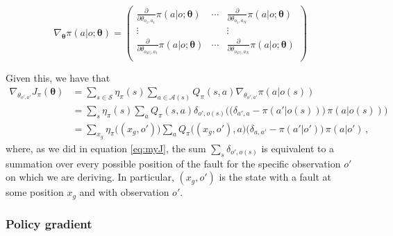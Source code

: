 \begin{equation}
    \nabla_{\boldsymbol \theta} \pi(a|o; \boldsymbol \theta) = \begin{pmatrix}
        \frac{\partial}{\partial \theta_{o_1,a_1}} \pi ( a | o; \boldsymbol \theta )
            & \cdots & \frac{\partial}{\partial \theta_{o_1,a_N}} \pi ( a | o; \boldsymbol \theta ) \\
        \vdots & &
        \vdots \\
        \frac{\partial}{\partial \theta_{o_{|\mathcal O|},a_1}} \pi ( a | o; \boldsymbol \theta ) 
            & \cdots & \frac{\partial}{\partial \theta_{o_{|\mathcal O|},a_N}} \pi ( a | o; \boldsymbol \theta ) \\
    \end{pmatrix}
\end{equation}

Given this, we have that
\begin{equation}
    \begin{aligned}
        \nabla_{\theta_{o',a'}} J_\pi (\boldsymbol \theta)
        &= \sum_{s \in \mathcal S} \eta_\pi(s) \sum_{a \in \mathcal A(s)} Q_\pi(s,a) \nabla_{\theta_{o',a'}} \pi(a|o(s)) \\
        &= \sum_s \eta_\pi(s) \sum_a Q_\pi(s,a) \delta_{o',o(s)} \Big( \big( \delta_{a',a} - \pi(a'|o(s)) \big) \, \pi(a|o(s)) \Big) \\
        &= \sum_{x_g} \eta_\pi \big((x_g, o') \big) \sum_a Q_\pi \big((x_g, o'),a \big) \big( \delta_{a,a'} - \pi(a'|o') \big) \, \pi(a|o') \, ,
    \end{aligned}
    \label{eq:mygradJ}
\end{equation}
where, as we did in equation \eqref{eq:myJ}, the sum $\sum_s \delta_{o', o(s)}$ is equivalent to a summation over every possible position of the fault for the specific observation $o'$ on which we are deriving. In particular, $(x_g, o')$ is the state with a fault at some position $x_g$ and with observation $o'$.


\subsubsection{Policy gradient}

